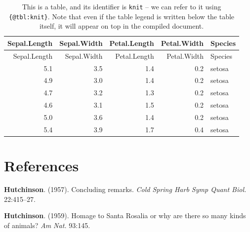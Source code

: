 \documentclass[12pt]{article}
\begin{document}
\begin{longtable}[]{@{}rrrrl@{}}
\caption{This is a table, and its identifier is \lstinline!knit! -- we
can refer to it using \lstinline!{@tbl:knit}!. Note that even if the
table legend is written below the table itself, it will appear on top in
the compiled document. \label{tbl:knit}}\tabularnewline
\toprule
Sepal.Length & Sepal.Width & Petal.Length & Petal.Width &
Species\tabularnewline
\midrule
\endfirsthead
\toprule
Sepal.Length & Sepal.Width & Petal.Length & Petal.Width &
Species\tabularnewline
\midrule
\endhead
5.1 & 3.5 & 1.4 & 0.2 & setosa\tabularnewline
4.9 & 3.0 & 1.4 & 0.2 & setosa\tabularnewline
4.7 & 3.2 & 1.3 & 0.2 & setosa\tabularnewline
4.6 & 3.1 & 1.5 & 0.2 & setosa\tabularnewline
5.0 & 3.6 & 1.4 & 0.2 & setosa\tabularnewline
5.4 & 3.9 & 1.7 & 0.4 & setosa\tabularnewline
\bottomrule
\end{longtable}

\section*{References}\label{references}

\hypertarget{refs}{}
\hypertarget{ref-hutc57cr}{}
\textbf{Hutchinson}. (1957). Concluding remarks. \emph{Cold Spring Harb
Symp Quant Biol.} 22:415--27.

\hypertarget{ref-hutc59hsr}{}
\textbf{Hutchinson}. (1959). Homage to Santa Rosalia or why are there so
many kinds of animals? \emph{Am Nat.} 93:145.
\end{document}
